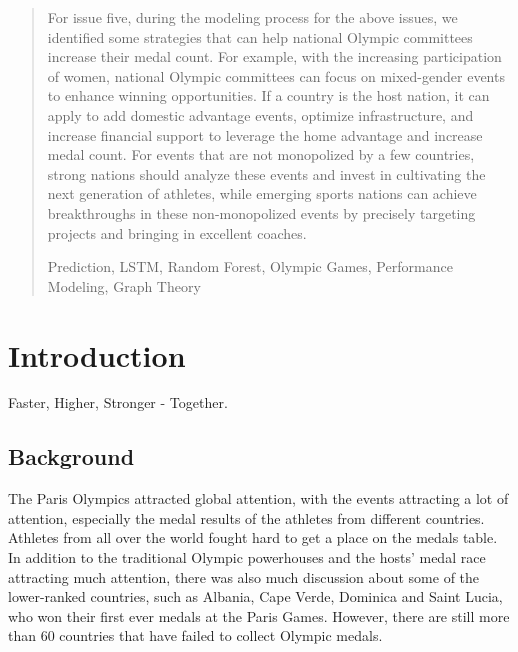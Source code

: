 \documentclass{mcmthesis}
\begin{document}
\begin{abstract}
    For issue five, during the modeling process for the above issues, we identified some strategies that can help national Olympic committees increase their medal count. For example, with the increasing participation of women, national Olympic committees can focus on mixed-gender events to enhance winning opportunities. If a country is the host nation, it can apply to add domestic advantage events, optimize infrastructure, and increase financial support to leverage the home advantage and increase medal count. For events that are not monopolized by a few countries, strong nations should analyze these events and invest in cultivating the next generation of athletes, while emerging sports nations can achieve breakthroughs in these non-monopolized events by precisely targeting projects and bringing in excellent coaches.
    \begin{keywords}
        Prediction, LSTM, Random Forest, Olympic Games, Performance Modeling, Graph Theory
\end{keywords}
\end{abstract}


\maketitle

\tableofcontents
\thispagestyle{empty}

\newpage
\section{Introduction}
\hfill Faster, Higher, Stronger - Together.
\subsection{Background}%
The Paris Olympics attracted global attention, with the events attracting a lot of attention, especially the medal results of the athletes from different countries. Athletes from all over the world fought hard to get a place on the medals table. In addition to the traditional Olympic powerhouses and the hosts' medal race attracting much attention, there was also much discussion about some of the lower-ranked countries, such as Albania, Cape Verde, Dominica and Saint Lucia, who won their first ever medals at the Paris Games. However, there are still more than 60 countries that have failed to collect Olympic medals.
\end{document}
